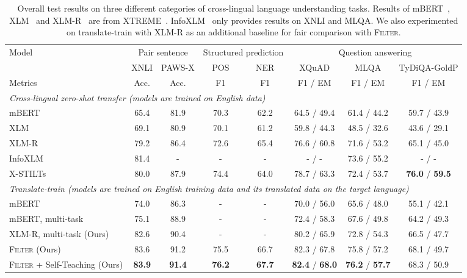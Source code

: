 \begin{table*}[t!]
\centering
\begin{adjustbox}{scale=0.95,center}
\begin{tabular}{lccccccc}
\toprule
\multirow{2}{*}{Model} & \multicolumn{2}{c}{Pair sentence} & \multicolumn{2}{c}{Structured prediction} & \multicolumn{3}{c}{Question answering}  \\
& XNLI & PAWS-X & POS & NER & XQuAD & MLQA & TyDiQA-GoldP \\
\midrule
Metrics & Acc. & Acc. & F1 & F1 & F1 / EM & F1 / EM & F1 / EM  \\
\midrule
\multicolumn{8}{l}{\emph{Cross-lingual zero-shot transfer (models are trained on English data)}} \\
\midrule
mBERT          & 65.4 & 81.9 & 70.3 & 62.2 & 64.5 / 49.4 & 61.4 / 44.2 & 59.7 / 43.9 \\
XLM            & 69.1 & 80.9 & 70.1 & 61.2 & 59.8 / 44.3 & 48.5 / 32.6 & 43.6 / 29.1 \\
XLM-R          & 79.2 & 86.4 & 72.6 & 65.4 & 76.6 / 60.8 & 71.6 / 53.2 & 65.1 / 45.0 \\
InfoXLM        & 81.4 & - & - & - & - / - & 73.6 / 55.2 & - / - \\
X-STILTs        & 80.0 & 87.9 & 74.4 & 64.0 & 78.7 / 63.3 & 72.4 / 53.7 & \textbf{76.0} / \textbf{59.5} \\
\midrule
\multicolumn{8}{l}{\emph{Translate-train (models are trained on English training data and its translated data on the target language)}} \\
\midrule
mBERT                    & 74.0 & 86.3 & -    & -    & 70.0 / 56.0 & 65.6 / 48.0 & 55.1 / 42.1 \\
mBERT, multi-task        & 75.1 & 88.9 & -    & -    & 72.4 / 58.3 & 67.6 / 49.8 & 64.2 / 49.3 \\
XLM-R, multi-task (Ours)  & 82.6 & 90.4 &  -   & -    & 80.2 / 65.9 & 72.8 / 54.3 & 66.5 / 47.7 \\
\midrule
\textsc{Filter} (Ours)                & 83.6   & 91.2 & 75.5 & 66.7 & 82.3 / 67.8  & 75.8 / 57.2 & 68.1 / 49.7 \\
\textsc{Filter} + Self-Teaching (Ours)  & \textbf{83.9}   & \textbf{91.4} & \textbf{76.2} & \textbf{67.7} & \textbf{82.4} / \textbf{68.0}  & \textbf{76.2} / \textbf{57.7} & 68.3 / 50.9 \\
\bottomrule
\end{tabular}
\end{adjustbox}
\caption{Overall test results on three different categories of cross-lingual language understanding tasks. Results of mBERT~\cite{devlin-etal-2019-bert}, XLM~\cite{lample2019cross} and XLM-R~\cite{conneau2019unsupervised} are from XTREME~\cite{hu2020xtreme}. InfoXLM~\cite{chi2020infoxlm} only provides results on XNLI and MLQA. We also experimented on translate-train with XLM-R as an additional baseline for fair comparison with \textsc{Filter}. 
}
\label{tbl:detailed_results_full}
\end{table*} 
